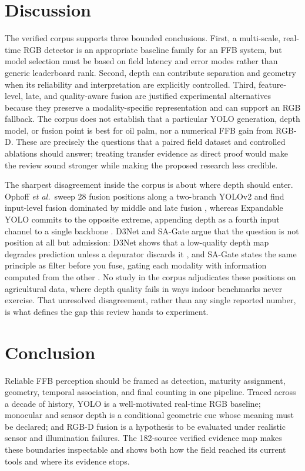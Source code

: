 \section{Discussion}

The verified corpus supports three bounded conclusions. First, a multi-scale, real-time RGB detector is an appropriate baseline family for an FFB system, but model selection must be based on field latency and error modes rather than generic leaderboard rank. Second, depth can contribute separation and geometry when its reliability and interpretation are explicitly controlled. Third, feature-level, late, and quality-aware fusion are justified experimental alternatives because they preserve a modality-specific representation and can support an RGB fallback. The corpus does not establish that a particular YOLO generation, depth model, or fusion point is best for oil palm, nor a numerical FFB gain from RGB-D. These are precisely the questions that a paired field dataset and controlled ablations should answer; treating transfer evidence as direct proof would make the review sound stronger while making the proposed research less credible.

The sharpest disagreement inside the corpus is about where depth should enter. Ophoff \textit{et al.}\ sweep 28 fusion positions along a two-branch YOLOv2 and find input-level fusion dominated by middle and late fusion \cite{ophoff2019multimodal}, whereas Expandable YOLO commits to the opposite extreme, appending depth as a fourth input channel to a single backbone \cite{takahashi2020expandableyolo}. D3Net and SA-Gate argue that the question is not position at all but admission: D3Net shows that a low-quality depth map degrades prediction unless a depurator discards it \cite{fan2020d3net}, and SA-Gate states the same principle as filter before you fuse, gating each modality with information computed from the other \cite{chen2020sagate}. No study in the corpus adjudicates these positions on agricultural data, where depth quality fails in ways indoor benchmarks never exercise. That unresolved disagreement, rather than any single reported number, is what defines the gap this review hands to experiment.

\section{Conclusion}

Reliable FFB perception should be framed as detection, maturity assignment, geometry, temporal association, and final counting in one pipeline. Traced across a decade of history, YOLO is a well-motivated real-time RGB baseline; monocular and sensor depth is a conditional geometric cue whose meaning must be declared; and RGB-D fusion is a hypothesis to be evaluated under realistic sensor and illumination failures. The 182-source verified evidence map makes these boundaries inspectable and shows both how the field reached its current tools and where its evidence stops.

